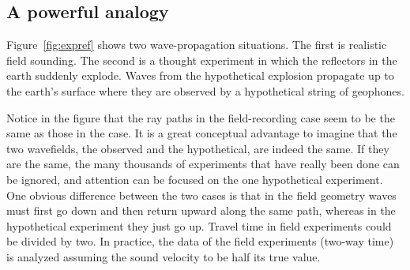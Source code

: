 \subsection{A powerful analogy}
\par
Figure~\ref{fig:expref} shows two wave-propagation situations. %
%
The first is realistic field sounding.
The second is a thought experiment in which
the reflectors in the earth suddenly explode.
Waves from the hypothetical explosion propagate
up to the earth's surface where they are
observed by a hypothetical string of geophones.
\par
Notice in the figure that the ray paths in the
field-recording case seem to be the
same as those in the  case.
It is a great conceptual advantage to imagine that the two wavefields,
the observed and the hypothetical, are indeed the same.
If they are the same,
the many thousands of experiments
that have really been done can be ignored,
and attention can be focused on the one hypothetical experiment.
One obvious difference between the two cases is that in the
field geometry waves must first go down
and then return upward along the same path,
whereas in the hypothetical experiment they just go up.
Travel time in field experiments could be divided by two.
In practice, the data of the field experiments (two-way time)
is analyzed assuming the sound velocity to be half its true value.

